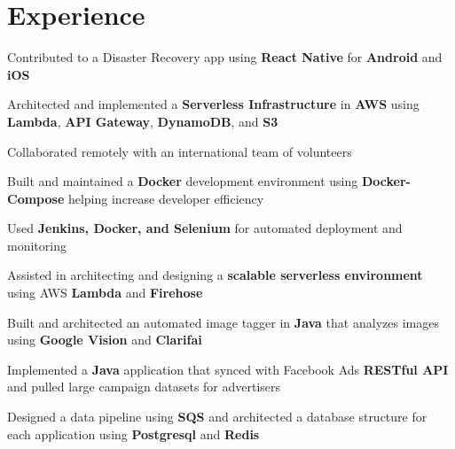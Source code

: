\documentclass[]{resume}
\begin{document}
\begin{minipage}[t]{0.66\textwidth}


\section{Experience}

\begin{tightemize}
\vspace{\topsep}
\item Contributed to a Disaster Recovery app using \textbf{React Native} for \textbf{Android} and \textbf{iOS}
\item Architected and implemented a \textbf{Serverless Infrastructure} in \textbf{AWS} using \textbf{Lambda}, \textbf{API Gateway}, \textbf{DynamoDB}, and \textbf{S3}
\item Collaborated remotely with an international team of volunteers
\end{tightemize}
\sectionsep

\begin{tightemize}
\item Built and maintained a \textbf{Docker} development environment using \textbf{Docker-Compose} helping increase developer efficiency
\item Used \textbf{Jenkins, Docker, and Selenium} for automated deployment and monitoring
\item Assisted in architecting and designing a \textbf{scalable serverless environment} using AWS \textbf{Lambda} and \textbf{Firehose}
\item Built and architected an automated image tagger in \textbf{Java} that analyzes images using \textbf{Google Vision} and \textbf{Clarifai}
\item Implemented a \textbf{Java} application that synced with Facebook Ads \textbf{RESTful API} and pulled large campaign datasets for advertisers
\item Designed a data pipeline using \textbf{SQS} and architected a database structure for each application using \textbf{Postgresql} and \textbf{Redis}
\end{tightemize}
\sectionsep


\end{minipage}
\end{document}
